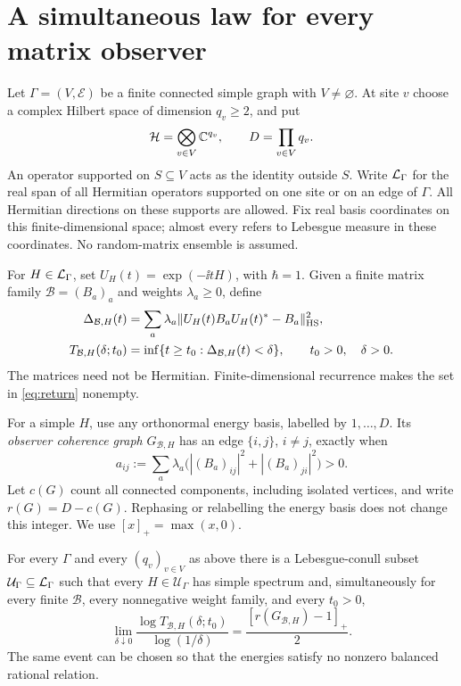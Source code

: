\section{A simultaneous law for every matrix observer}

Let $\Gamma=(V,\mathcal E)$ be a finite connected simple graph with
$V\ne\varnothing$. At site $v$ choose a complex Hilbert space of dimension
$q_v\geq2$, and put
\[
 \mathcal H=\bigotimes_{v\in V}\mathbb C^{q_v},\qquad D=\prod_{v\in V}q_v.
\]
An operator supported on $S\subseteq V$ acts as the identity outside $S$.
Write $\mathcal L_\Gamma$ for the real span of all Hermitian operators supported
on one site or on an edge of $\Gamma$. All Hermitian directions on these
supports are allowed. Fix real basis coordinates on this finite-dimensional
space; almost every refers to Lebesgue measure in these coordinates.
No random-matrix ensemble is assumed.

For $H\in\mathcal L_\Gamma$, set $U_H(t)=\exp(-\ii tH)$, with $\hbar=1$.
Given a finite matrix family $\mathcal B=(B_a)_a$ and weights
$\lambda_a\geq0$, define
\begin{align}
 \Delta_{\mathcal B,H}(t)
   &=\sum_a\lambda_a\|U_H(t)B_aU_H(t)^*-B_a\|_{\mathrm{HS}}^2,
       \label{eq:defect}\\
 T_{\mathcal B,H}(\delta;t_0)
   &=\inf\{t\geq t_0:\Delta_{\mathcal B,H}(t)<\delta\},
       \qquad t_0>0,\quad \delta>0.                 \label{eq:return}
\end{align}
The matrices need not be Hermitian. Finite-dimensional recurrence makes
the set in \eqref{eq:return} nonempty.

For a simple $H$, use any orthonormal energy basis, labelled by
$1,\ldots,D$. Its \emph{observer coherence graph} $G_{\mathcal B,H}$ has
an edge $\{i,j\}$, $i\ne j$, exactly when
\begin{equation}
 a_{ij}:=\sum_a\lambda_a
       \bigl(|(B_a)_{ij}|^2+|(B_a)_{ji}|^2\bigr)>0.
 \label{eq:weights}
\end{equation}
Let $c(G)$ count all connected components, including isolated vertices,
and write $r(G)=D-c(G)$. Rephasing or relabelling the energy basis does not
change this integer. We use $[x]_+=\max(x,0)$.

\begin{theorem}\label{thm:network}
For every $\Gamma$ and every $(q_v)_{v\in V}$ as above there is a
Lebesgue-conull subset $\mathcal U_\Gamma\subseteq\mathcal L_\Gamma$ such that
every $H\in\mathcal U_\Gamma$ has simple spectrum and, simultaneously for
every finite $\mathcal B$, every nonnegative weight family, and every
$t_0>0$,
\begin{equation}
 \lim_{\delta\downarrow0}
 \frac{\log T_{\mathcal B,H}(\delta;t_0)}{\log(1/\delta)}
       =\frac{[r(G_{\mathcal B,H})-1]_+}{2}.
 \label{eq:main}
\end{equation}
The same event can be chosen so that the energies satisfy no nonzero
balanced rational relation.
\end{theorem}


